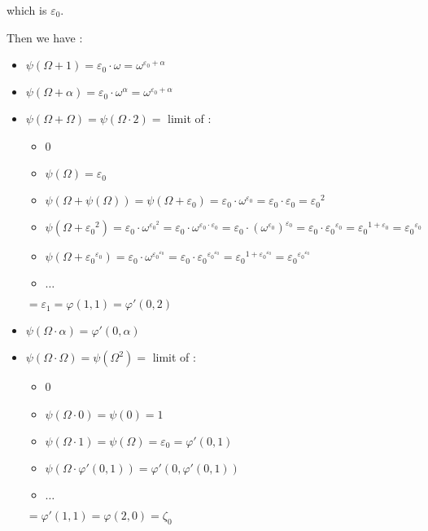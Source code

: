 \documentclass[10pt]{article}
\begin{document}
which is \( \varepsilon_0 \).

Then we have : 

\begin{itemize}
     \setlength{\itemsep}{1pt}
     \setlength{\parskip}{0pt}
     \setlength{\parsep}{0pt}

\item \( \psi(\Omega+1) = \varepsilon_0 \cdot \omega = \omega^{\varepsilon_0+\alpha} \)

\item \( \psi(\Omega+\alpha) = \varepsilon_0 \cdot \omega^\alpha = \omega^{\varepsilon_0+\alpha} \)

\item \( \psi(\Omega+\Omega) = \psi(\Omega \cdot 2) = \) limit of : 
   \begin{itemize}
     \setlength{\itemsep}{1pt}
     \setlength{\parskip}{0pt}
     \setlength{\parsep}{0pt}
   \item 0
   \item \( \psi(\Omega) = \varepsilon_0 \)
   \item \( \psi(\Omega+\psi(\Omega)) = \psi(\Omega+\varepsilon_0) = \varepsilon_0 \cdot \omega^{\varepsilon_0} = \varepsilon_0 \cdot \varepsilon_0 = {\varepsilon_0}^2 \)
   \item \( \psi(\Omega+{\varepsilon_0}^2) = \varepsilon_0 \cdot \omega^{{\varepsilon_0}^2} = \varepsilon_0 \cdot \omega^{\varepsilon_0 \cdot \varepsilon_0} = \varepsilon_0 \cdot (\omega^{\varepsilon_0})^{\varepsilon_0} = \varepsilon_0 \cdot {\varepsilon_0}^{\varepsilon_0} = {\varepsilon_0}^{1+\varepsilon_0} = {\varepsilon_0}^{\varepsilon_0} \)
   \item \( \psi(\Omega+{\varepsilon_0}^{\varepsilon_0}) = \varepsilon_0 \cdot \omega^{{\varepsilon_0}^{\varepsilon_0}} = \varepsilon_0 \cdot {\varepsilon_0}^{{\varepsilon_0}^{\varepsilon_0}} = {\varepsilon_0}^{1+{\varepsilon_0}^{\varepsilon_0}} = {\varepsilon_0}^{{\varepsilon_0}^{\varepsilon_0}} \)
   \item \( \ldots \)
   \end{itemize}
   \( = \varepsilon_1 = \varphi(1,1) = \varphi'(0,2) \)

\item \( \psi(\Omega \cdot \alpha) = \varphi'(0,\alpha) \)

\item \( \psi(\Omega \cdot \Omega) = \psi(\Omega^2) = \) limit of : 
   \begin{itemize}
     \setlength{\itemsep}{1pt}
     \setlength{\parskip}{0pt}
     \setlength{\parsep}{0pt}
   \item 0
   \item \( \psi(\Omega \cdot 0) = \psi(0) = 1 \)
   \item \( \psi(\Omega \cdot 1) = \psi(\Omega) = \varepsilon_0 = \varphi'(0,1) \)
   \item \( \psi(\Omega \cdot \varphi'(0,1)) = \varphi'(0,\varphi'(0,1)) \)
   \item \( \ldots \)
   \end{itemize}
   \( = \varphi'(1,1) = \varphi(2,0) = \zeta_0 \)


\end{itemize}
\end{document}
